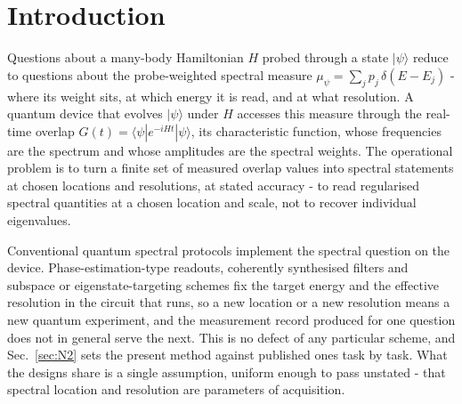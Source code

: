 \section{Introduction}\label{sec:N1}

Questions about a many-body Hamiltonian $H$ probed through a state $|\psi\rangle$ reduce to questions about the probe-weighted spectral measure $\mu_\psi = \sum_j p_j\,\delta(E - E_j)$ - where its weight sits, at which energy it is read, and at what resolution. A quantum device that evolves $|\psi\rangle$ under $H$ accesses this measure through the real-time overlap $G(t) = \langle\psi|e^{-iHt}|\psi\rangle$, its characteristic function, whose frequencies are the spectrum and whose amplitudes are the spectral weights. The operational problem is to turn a finite set of measured overlap values into spectral statements at chosen locations and resolutions, at stated accuracy - to read regularised spectral quantities at a chosen location and scale, not to recover individual eigenvalues.

Conventional quantum spectral protocols implement the spectral question on the device. Phase-estimation-type readouts, coherently synthesised filters and subspace or eigenstate-targeting schemes fix the target energy and the effective resolution in the circuit that runs, so a new location or a new resolution means a new quantum experiment, and the measurement record produced for one question does not in general serve the next. This is no defect of any particular scheme, and Sec.~\ref{sec:N2} sets the present method against published ones task by task. What the designs share is a single assumption, uniform enough to pass unstated - that spectral location and resolution are parameters of acquisition.

